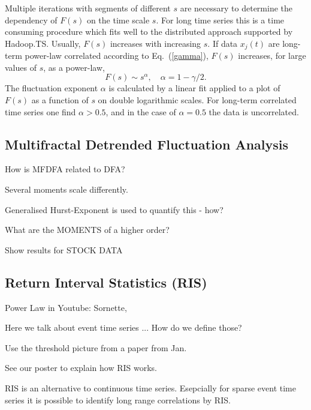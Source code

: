 \documentclass[a4paper,10pt]{scrbook}
\begin{document}
Multiple iterations with segments of different $s$ are necessary to determine the dependency 
of $F(s)$ on the time scale $s$.  For long time series this is a time consuming procedure which fits well to the 
distributed approach supported by Hadoop.TS.  Usually, $F(s)$ increases with increasing 
$s$.  If data $x_{j}(t)$ are long-term power-law correlated according to Eq.~(\ref{gamma}), $F(s)$ increases, 
for large values of $s$, as a power-law, \cite{Peng.1994,Kantelhardt.2001,Kantelhardt.2009}
%
\begin{equation}
F(s)\sim s^{\alpha },\quad \alpha =1-\gamma /2.  \label{alpha}
\end{equation}%
%
The fluctuation exponent $\alpha$ is calculated by a linear fit applied to a plot of $F(s)$ as a function of $s$ 
on double logarithmic scales.  For long-term correlated time series one find $\alpha > 0.5$, and in the case of 
$\alpha = 0.5$ the data is uncorrelated. 




\subsection{Multifractal Detrended Fluctuation Analysis}
How is MFDFA related to DFA?

Several moments scale differently. 

Generalised Hurst-Exponent is used to quantify this - how?

What are the MOMENTS of a higher order?

Show results for STOCK DATA 


\subsection{Return Interval Statistics (RIS)}
\label{sec.RIS}

Power Law in Youtube: Sornette, \cite{G}

Here we talk about event time series ... How do we define those?

Use the threshold picture from a paper from Jan.

See our poster to explain how RIS works.

RIS is an alternative to continuous time series. Esepcially for sparse event time series it is possible to identify long range correlations by RIS.
\end{document}
